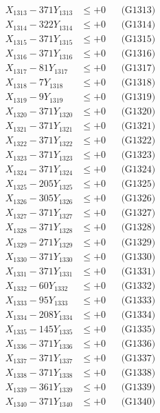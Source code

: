 \documentclass[a4paper,10pt]{article}
\begin{document}
{\begin{align}
X_{1313} - 371Y_{1313} &\leq +0 && \text{(G1313)} \\
X_{1314} - 322Y_{1314} &\leq +0 && \text{(G1314)} \\
X_{1315} - 371Y_{1315} &\leq +0 && \text{(G1315)} \\
X_{1316} - 371Y_{1316} &\leq +0 && \text{(G1316)} \\
X_{1317} - 81Y_{1317} &\leq +0 && \text{(G1317)} \\
X_{1318} - 7Y_{1318} &\leq +0 && \text{(G1318)} \\
X_{1319} - 9Y_{1319} &\leq +0 && \text{(G1319)} \\
X_{1320} - 371Y_{1320} &\leq +0 && \text{(G1320)} \\
\allowbreak
X_{1321} - 371Y_{1321} &\leq +0 && \text{(G1321)} \\
X_{1322} - 371Y_{1322} &\leq +0 && \text{(G1322)} \\
X_{1323} - 371Y_{1323} &\leq +0 && \text{(G1323)} \\
X_{1324} - 371Y_{1324} &\leq +0 && \text{(G1324)} \\
X_{1325} - 205Y_{1325} &\leq +0 && \text{(G1325)} \\
X_{1326} - 305Y_{1326} &\leq +0 && \text{(G1326)} \\
X_{1327} - 371Y_{1327} &\leq +0 && \text{(G1327)} \\
X_{1328} - 371Y_{1328} &\leq +0 && \text{(G1328)} \\
X_{1329} - 271Y_{1329} &\leq +0 && \text{(G1329)} \\
X_{1330} - 371Y_{1330} &\leq +0 && \text{(G1330)} \\
\allowbreak
X_{1331} - 371Y_{1331} &\leq +0 && \text{(G1331)} \\
X_{1332} - 60Y_{1332} &\leq +0 && \text{(G1332)} \\
X_{1333} - 95Y_{1333} &\leq +0 && \text{(G1333)} \\
X_{1334} - 208Y_{1334} &\leq +0 && \text{(G1334)} \\
X_{1335} - 145Y_{1335} &\leq +0 && \text{(G1335)} \\
X_{1336} - 371Y_{1336} &\leq +0 && \text{(G1336)} \\
X_{1337} - 371Y_{1337} &\leq +0 && \text{(G1337)} \\
X_{1338} - 371Y_{1338} &\leq +0 && \text{(G1338)} \\
X_{1339} - 361Y_{1339} &\leq +0 && \text{(G1339)} \\
X_{1340} - 371Y_{1340} &\leq +0 && \text{(G1340)} \\

\end{align}}
\end{document}
